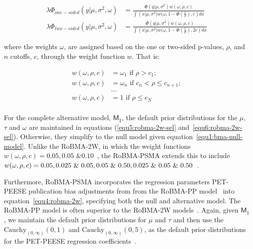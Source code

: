 \documentclass[12pt, english]{article}
\begin{document}
    \begin{align}
        \lambda\Phi_{one-sided}(y | \mu, \sigma^{2}, \omega) &= \frac{\Phi(y | \mu, \sigma^{2}) w(\omega, \rho, c)}{\int \left(x | \mu, \sigma^{2}) w(\omega, 1 - \Phi(\frac{x}{\sigma}), c \right) dx} \label{equ5:robma-2w-sel} \\
        \lambda\Phi_{two-sided}(y | \mu, \sigma^{2}, \omega) &= \frac{\Phi(y | \mu, \sigma^{2}) w(\omega, \rho,  c)}{\int \left(x | \mu, \sigma^{2}) w(\omega, 1 - \Phi(\frac{x}{\sigma}), 2c \right) dx} \label{equ6:robma-2w-sel}
    \end{align}

    where the weights $\omega$, are assigned based on the one or two-sided p-values, $\rho$, and $n$ cutoffs, $c$, through the weight function $w$. That is:

    \begin{equation}
        \begin{split}
            \label{equ7:robma-2w-cutoffs}
            w(\omega, \rho, c) &= \omega_1 \text{ if } \rho > c_1; \\
            w(\omega, \rho, c) &= \omega_n \text{ if } c_n < \rho \leqslant c_{n + 1}; \\
            &\dots \\
            w(\omega, \rho, c) &= 1 \text{ if } \rho \leqslant c_N \\
        \end{split}
    \end{equation}

    For the complete alternative model, $\mathsf{M_1}$, the default prior distributions for the $\mu$, $\tau$ and $\omega$ are maintained in equations (\ref{equ5:robma-2w-sel} and~\ref{equ6:robma-2w-sel}). Otherwise, they simplify to the null model given equation~\ref{equ1:bma-null-model}. Unlike the RoBMA-2W, in which the weight functions $w(\omega, \rho, c) = 0.05, 0.05 \text{ \& } 0.10$~\parencite{maier2022}, the RoBMA-PSMA extends this to include $w(\omega,\rho, c) = 0.05, 0.025 \text{ \& } 0.05, 0.05 \text{ \& } 0.50, \break 0.025 \text{ \& } 0.05\text{ \& }0.50$~\parencite{bartos2022}.

    Furthermore, RoBMA-PSMA incorporates the regression parameters PET-PEESE publication bias adjustments from from the RoBMA-PP model~\parencite{bartos2021, bartos2022} into equation~\ref{equ4:robma-2w}, specifying both the null and alternative model. The RoBMA-PP model is often superior to the RoBMA-2W models~\parencites{kvarven2020,cartermccullough2014,moreno2009}. Again, given $\mathsf{M_1}$, we maintain the default prior distributions for $\mu$ and $\tau$ and then use the $\text{Cauchy}_{(0, \infty)} (0,1)$ and $\text{Cauchy}_{(0, \infty)} (0,5)$, as the default prior distributions for the PET-PEESE regression coefficients~\parencites{bartos2022, stanleydoucouliagos2014}.
\end{document}
